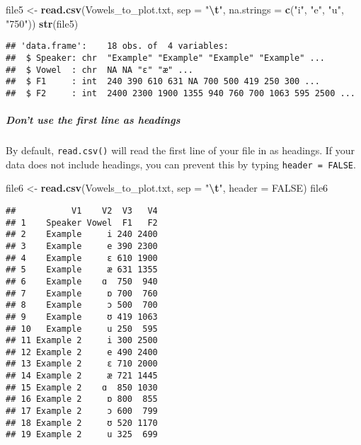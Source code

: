 \documentclass[
]{article}
\newenvironment{Shaded}{\begin{snugshade}}{\end{snugshade}}
\newcommand{\AttributeTok}[1]{\textcolor[rgb]{0.13,0.29,0.53}{#1}}
\newcommand{\ConstantTok}[1]{\textcolor[rgb]{0.56,0.35,0.01}{#1}}
\newcommand{\FunctionTok}[1]{\textcolor[rgb]{0.13,0.29,0.53}{\textbf{#1}}}
\newcommand{\NormalTok}[1]{#1}
\newcommand{\OtherTok}[1]{\textcolor[rgb]{0.56,0.35,0.01}{#1}}
\newcommand{\SpecialCharTok}[1]{\textcolor[rgb]{0.81,0.36,0.00}{\textbf{#1}}}
\newcommand{\StringTok}[1]{\textcolor[rgb]{0.31,0.60,0.02}{#1}}
\begin{document}
\begin{Shaded}
\begin{Highlighting}[]
\NormalTok{file5 }\OtherTok{\textless{}{-}} \FunctionTok{read.csv}\NormalTok{(}\StringTok{\textquotesingle{}Vowels\_to\_plot.txt\textquotesingle{}}\NormalTok{, }\AttributeTok{sep =} \StringTok{"}\SpecialCharTok{\textbackslash{}t}\StringTok{"}\NormalTok{, }\AttributeTok{na.strings =} \FunctionTok{c}\NormalTok{(}\StringTok{"i"}\NormalTok{, }\StringTok{"e"}\NormalTok{, }\StringTok{"u"}\NormalTok{, }\StringTok{"750"}\NormalTok{))}
\FunctionTok{str}\NormalTok{(file5)}
\end{Highlighting}
\end{Shaded}

\begin{verbatim}
## 'data.frame':    18 obs. of  4 variables:
##  $ Speaker: chr  "Example" "Example" "Example" "Example" ...
##  $ Vowel  : chr  NA NA "ɛ" "æ" ...
##  $ F1     : int  240 390 610 631 NA 700 500 419 250 300 ...
##  $ F2     : int  2400 2300 1900 1355 940 760 700 1063 595 2500 ...
\end{verbatim}

\hypertarget{dont-use-the-first-line-as-headings}{%
\subparagraph{Don't use the first line as
headings}\label{dont-use-the-first-line-as-headings}}

By default, \texttt{read.csv()} will read the first line of your file in
as headings. If your data does not include headings, you can prevent
this by typing \texttt{header\ =\ FALSE}.

\begin{Shaded}
\begin{Highlighting}[]
\NormalTok{file6 }\OtherTok{\textless{}{-}} \FunctionTok{read.csv}\NormalTok{(}\StringTok{\textquotesingle{}Vowels\_to\_plot.txt\textquotesingle{}}\NormalTok{, }\AttributeTok{sep =} \StringTok{"}\SpecialCharTok{\textbackslash{}t}\StringTok{"}\NormalTok{, }\AttributeTok{header =} \ConstantTok{FALSE}\NormalTok{)}
\NormalTok{file6}
\end{Highlighting}
\end{Shaded}

\begin{verbatim}
##           V1    V2  V3   V4
## 1    Speaker Vowel  F1   F2
## 2    Example     i 240 2400
## 3    Example     e 390 2300
## 4    Example     ɛ 610 1900
## 5    Example     æ 631 1355
## 6    Example    ɑ  750  940
## 7    Example     ɒ 700  760
## 8    Example     ɔ 500  700
## 9    Example     ʊ 419 1063
## 10   Example     u 250  595
## 11 Example 2     i 300 2500
## 12 Example 2     e 490 2400
## 13 Example 2     ɛ 710 2000
## 14 Example 2     æ 721 1445
## 15 Example 2    ɑ  850 1030
## 16 Example 2     ɒ 800  855
## 17 Example 2     ɔ 600  799
## 18 Example 2     ʊ 520 1170
## 19 Example 2     u 325  699
\end{verbatim}
\end{document}
